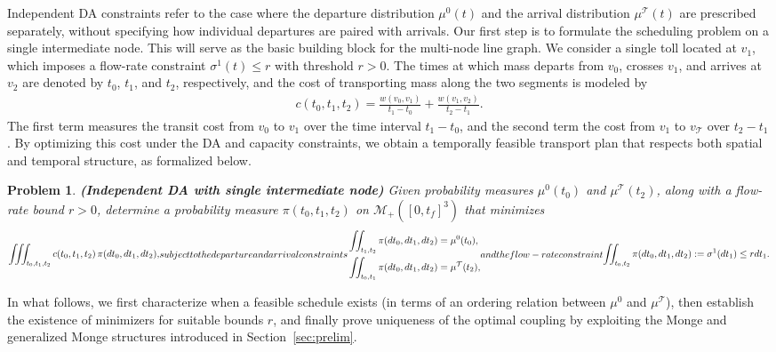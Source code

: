 \documentclass[11pt]{article}
\newcommand{\calT}{{\mathcal T}}
\newtheorem{problem}{Problem}
\begin{document}
Independent DA constraints refer to the case where the departure distribution $\mu^0(t)$ and the arrival distribution $\mu^\calT(t)$ are prescribed separately, without specifying how individual departures are paired with arrivals. Our first step is to formulate the scheduling problem on a single intermediate node. This will serve as the basic building block for the multi-node line graph. We consider a single toll located at $v_1$, which imposes a flow-rate constraint $\sigma^1(t) \leq r$ with threshold $r>0$. The times at which mass departs from $v_0$, crosses $v_1$, and arrives at $v_2$ are denoted by $t_0$, $t_1$, and $t_2$, respectively, and the cost of transporting mass along the two segments is modeled by
\begin{align}\label{eq:cost-function-1}
c(t_0, t_1, t_2)
=
\frac{w(v_0, v_1)}{t_1 - t_0}
+
\frac{w(v_1, v_2)}{t_2 - t_1}.
\end{align}
The first term measures the transit cost from $v_0$ to $v_1$ over the time interval $t_1 - t_0$, and the second term the cost from $v_1$ to $v_\calT$ over $t_2 - t_1$. By optimizing this cost under the DA and capacity constraints, we obtain a temporally feasible transport plan that respects both spatial and temporal structure, as formalized below.

\begin{problem}\label{prob:problem1}
{\bf \textit{(Independent DA with single intermediate node)}} Given probability measures $\mu^0(t_0)$ and $\mu^\calT(t_2)$, along with a flow-rate bound $r > 0$, determine a probability measure $\pi(t_0,t_1,t_2)$ on $\mathcal{M}_+([0, t_f]^3)$ that minimizes
\begin{subequations}
\begin{align}\label{eq:obj1}
\iiint_{t_0,t_1,t_2} c(t_0, t_1, t_2) \,\pi(dt_0,dt_1,dt_2),
\end{align}
subject to the departure and arrival constraints
\begin{align}
&\iint_{t_1,t_2} \pi(dt_0,dt_1,dt_2) = \mu^0(t_0),\\
&\iint_{t_0,t_1} \pi(dt_0,dt_1,dt_2) = \mu^\calT(t_2),
\end{align}
and the flow-rate constraint
{\setlength{\abovedisplayskip}{7pt}%
 \setlength{\belowdisplayskip}{7pt}%
\begin{align}
\iint_{t_0,t_2} \pi(dt_0,dt_1,dt_2) := \sigma^1(dt_1) \leq r dt_1.
\end{align}}%
\end{subequations}
\end{problem}
In what follows, we first characterize when a feasible schedule exists (in terms of an ordering relation between $\mu^0$ and $\mu^\calT$), then establish the existence of minimizers for suitable bounds $r$, and finally prove uniqueness of the optimal coupling by exploiting the Monge and generalized Monge structures introduced in Section~\ref{sec:prelim}.
\end{document}
